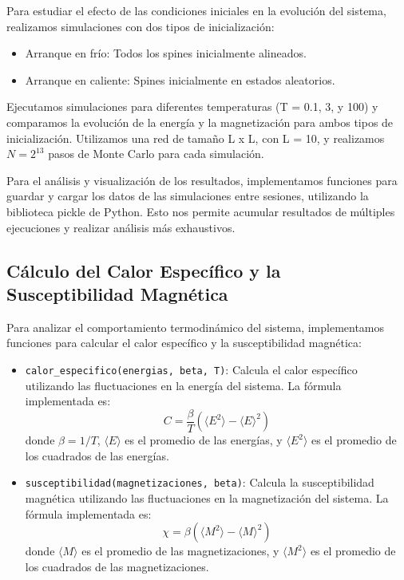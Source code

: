 \documentclass[twocolumn]{article}
\begin{document}
Para estudiar el efecto de las condiciones iniciales en la evolución del sistema, realizamos simulaciones con dos tipos de inicialización:

\begin{itemize}
    \item Arranque en frío: Todos los spines inicialmente alineados.
    \item Arranque en caliente: Spines inicialmente en estados aleatorios.
\end{itemize}

Ejecutamos simulaciones para diferentes temperaturas (T = 0.1, 3, y 100) y comparamos la evolución de la energía y la magnetización para ambos tipos de inicialización. Utilizamos una red de tamaño L x L, con L = 10, y realizamos $N = 2^{13}$ pasos de Monte Carlo para cada simulación.

Para el análisis y visualización de los resultados, implementamos funciones para guardar y cargar los datos de las simulaciones entre sesiones, utilizando la biblioteca pickle de Python. Esto nos permite acumular resultados de múltiples ejecuciones y realizar análisis más exhaustivos.

\subsection*{Cálculo del Calor Específico y la Susceptibilidad Magnética}

Para analizar el comportamiento termodinámico del sistema, implementamos funciones para calcular el calor específico y la susceptibilidad magnética:

\begin{itemize}
    \item \texttt{calor\_especifico(energias, beta, T)}: Calcula el calor específico utilizando las fluctuaciones en la energía del sistema. La fórmula implementada es:
    \begin{equation}
        C = \frac{\beta}{T} (\langle E^2 \rangle - \langle E \rangle^2)
    \end{equation}
    donde $\beta = 1/T$, $\langle E \rangle$ es el promedio de las energías, y $\langle E^2 \rangle$ es el promedio de los cuadrados de las energías.

    \item \texttt{susceptibilidad(magnetizaciones, beta)}: Calcula la susceptibilidad magnética utilizando las fluctuaciones en la magnetización del sistema. La fórmula implementada es:
    \begin{equation}
        \chi = \beta (\langle M^2 \rangle - \langle M \rangle^2)
    \end{equation}
    donde $\langle M \rangle$ es el promedio de las magnetizaciones, y $\langle M^2 \rangle$ es el promedio de los cuadrados de las magnetizaciones.
\end{itemize}
\end{document}
